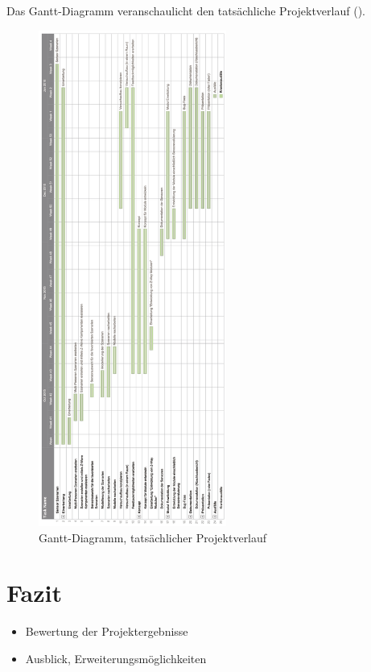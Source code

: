 \documentclass[12pt, oneside, smallheadings]{scrbook}
\begin{document}
Das Gantt-Diagramm veranschaulicht den tatsächliche Projektverlauf ().

\begin{figure}[h!]
	\centering
	\includegraphics[width=0.55\textwidth]{img/Projektverlauf/GanttDiagramm.png}
	\caption{Gantt-Diagramm, tatsächlicher Projektverlauf}
	\label{fig:projektverlaufGanttDiagramm}
\end{figure}



\chapter{Fazit}
\begin{itemize}
	\item Bewertung der Projektergebnisse
	\item Ausblick, Erweiterungsmöglichkeiten
\end{itemize}
\end{document}
